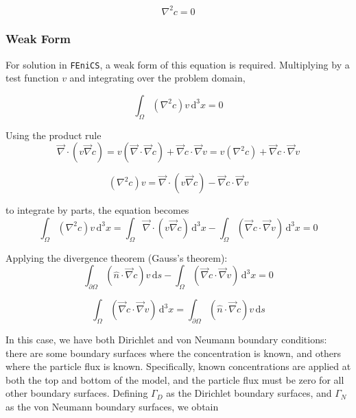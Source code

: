 \begin{equation}
\nabla^2 c = 0
\end{equation}

\subsubsection{Weak Form}\label{subsubsec:unhom_fick_weak}

For solution in \texttt{FEniCS}, a weak form of this equation is required.
Multiplying by a test function $v$ and integrating over the problem domain,

\begin{equation}
\int_{\Omega} \left(\nabla^2 c \right) v \,\mathrm{d}^3x = 0
\end{equation}

Using the product rule
\begin{equation}
\vec{\nabla} \cdot \left( v \vec{\nabla} c \right) =
v \left(\vec{\nabla} \cdot \vec{\nabla} c \right) + \vec{\nabla}c \cdot \vec{\nabla}v =
v \left(\nabla^2 c \right) + \vec{\nabla}c \cdot \vec{\nabla}v
\end{equation}

\begin{equation}
\left(\nabla^2 c \right) v =
\vec{\nabla} \cdot \left( v \vec{\nabla} c \right) - \vec{\nabla}c \cdot \vec{\nabla}v
\end{equation}

to integrate by parts, the equation becomes
\begin{equation}
\int_{\Omega} \left(\nabla^2 c \right) v \,\mathrm{d}^3x =
\int_{\Omega} \vec{\nabla} \cdot \left( v \vec{\nabla} c \right) \,\mathrm{d}^3x
- \int_{\Omega} \left( \vec{\nabla}c \cdot \vec{\nabla}v \right) \,\mathrm{d}^3x =0
\end{equation}

Applying the divergence theorem (Gauss's theorem):
\begin{equation}
\int_{\partial\Omega} \left( \hat{n} \cdot \vec{\nabla} c \right) v\,\mathrm{d}s
- \int_{\Omega} \left( \vec{\nabla}c \cdot \vec{\nabla}v \right) \,\mathrm{d}^3x = 0
\end{equation}

\begin{equation}
\int_{\Omega} \left( \vec{\nabla}c \cdot \vec{\nabla}v \right) \,\mathrm{d}^3x =
\int_{\partial\Omega} \left( \hat{n} \cdot \vec{\nabla} c \right) v\,\mathrm{d}s
\end{equation}

In this case, we have both Dirichlet and von Neumann boundary conditions:
there are some boundary surfaces where the concentration is known,
and others where the particle flux is known.
Specifically, known concentrations are applied at both the top and bottom of the model,
and the particle flux must be zero for all other boundary surfaces.
Defining $\Gamma_D$ as the Dirichlet boundary surfaces,
and $\Gamma_N$ as the von Neumann boundary surfaces, we obtain

